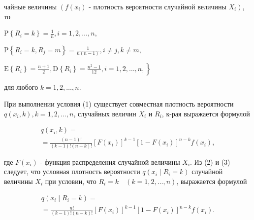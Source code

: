 \documentclass[10pt]{article}
\begin{document}
чайные величины $\left(f\left(x_{i}\right)\right.$ - плотность вероятности случайной величины $\left.X_{i}\right)$, то



$\mathrm{P}\left\{R_{i}=k\right\}=\frac{1}{n}, i=1,2, \ldots, n$,



$\mathrm{P}\left\{R_{i}=k, R_{j}=m\right\}=\frac{1}{n(n-1)}, i \neq j, k \neq m$,



$\left.\mathrm{E}\left\{R_{i}\right\}=\frac{n+1}{2}, \mathrm{D}\left\{R_{i}\right\}=\frac{n^{2}-1}{12}, i=1,2, \ldots, n,\right\}$



для любого $k=1,2, \ldots, n$.



При выполнении условия (1) существует совместная плотность вероятности $q\left(x_{i}, k\right), k=1,2, \ldots, n$, случайных величин $X_{i}$ и $R_{i}$, к-рая выражается формулой



\[

\begin{gathered}

q\left(x_{i}, k\right)= \\

=\frac{(n-1) !}{(k-1) !(n-k) !}\left[F\left(x_{i}\right)\right]^{k-1}\left[1-F\left(x_{i}\right)\right]^{n-k} f\left(x_{i}\right),

\end{gathered}

\]



где $F\left(x_{i}\right)$ - функция распределения случайной величины $X_{i}$. Из (2) и (3) следует, что условная плотность вероятности $q\left(x_{i} \mid R_{i}=k\right)$ случайной величины $X_{i}$ при условии, что $R_{i}=k \quad(k=1,2, \ldots, n)$, выражается формулой



\[

\begin{gathered}

q\left(x_{i} \mid R_{i}=k\right)= \\

=\frac{n !}{(k-1) !(n-k) !}\left[F\left(x_{i}\right)\right]^{k-1}\left[1-F\left(x_{i}\right)\right]^{n-k} f\left(x_{i}\right) .

\end{gathered}

\]
\end{document}
